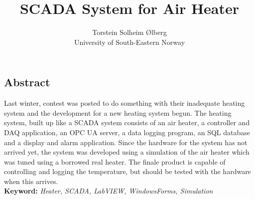 \documentclass[11pt, A4paper, english]{article}
\author{Torstein Solheim Ølberg \\
	University of South-Eastern Norway}
\title{SCADA System for Air Heater}
\numberwithin{equation}{section}
\begin{document}
	\maketitle
	
	\begin{multicols}{2}
		\section*{Abstract}
Last winter, contest was posted to do something with their inadequate heating system and the development for a new heating system begun. The heating system, built up like a SCADA system consists of an air heater, a controller and DAQ application, an OPC UA server, a data logging program, an SQL database and a display and alarm application. Since the hardware for the system has not arrived yet, the system was developed using a simulation of the air heater which was tuned using a borrowed real heater. The finale product is capable of controlling and logging the temperature, but should be tested with the hardware when this arrives. \\
\newline
\textbf{Keyword:} \textit{Heater, SCADA, LabVIEW, WindowsForms, Simulation}


\end{multicols}
\end{document}
